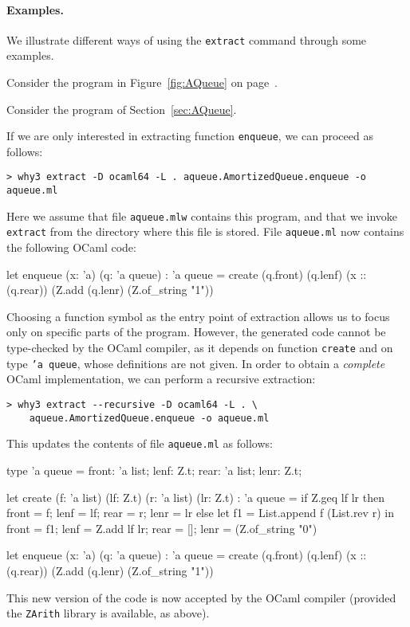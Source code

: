 \paragraph{Examples.}
We illustrate different ways of using the \texttt{extract} command through some
examples.
\begin{latexonly}
Consider the program in Figure~\ref{fig:AQueue} on page~\pageref{fig:AQueue}.
\end{latexonly}
\begin{htmlonly}
Consider the program of Section~\ref{sec:AQueue}.
\end{htmlonly}
If we are only interested in extracting function
\texttt{enqueue}, we can proceed as follows:
\begin{verbatim}
> why3 extract -D ocaml64 -L . aqueue.AmortizedQueue.enqueue -o aqueue.ml
\end{verbatim}
Here we assume that file \texttt{aqueue.mlw} contains this program, and that
we invoke \texttt{extract} from the directory where this file is stored. File
\texttt{aqueue.ml} now contains the following OCaml code:
\begin{whycode}
let enqueue (x: 'a) (q: 'a queue) : 'a queue =
  create (q.front) (q.lenf) (x :: (q.rear))
    (Z.add (q.lenr) (Z.of_string "1"))
\end{whycode}
Choosing a function symbol as the entry point of extraction allows us to focus
only on specific parts of the program. However, the generated code cannot be
type-checked by the OCaml compiler, as it depends on function \texttt{create}
and on type \texttt{'a queue}, whose definitions are not given. In order to
obtain a \emph{complete} OCaml implementation, we can perform a recursive
extraction:
\begin{verbatim}
> why3 extract --recursive -D ocaml64 -L . \
    aqueue.AmortizedQueue.enqueue -o aqueue.ml
\end{verbatim}
This updates the contents of file \texttt{aqueue.ml} as follows:
\begin{whycode}
type 'a queue = {
  front: 'a list;
  lenf: Z.t;
  rear: 'a list;
  lenr: Z.t;
  }

let create (f: 'a list) (lf: Z.t) (r: 'a list) (lr: Z.t) : 'a queue =
  if Z.geq lf lr
  then
    { front = f; lenf = lf; rear = r; lenr = lr }
  else
    let f1 = List.append f (List.rev r) in
    { front = f1; lenf = Z.add lf lr; rear = []; lenr = (Z.of_string "0") }

let enqueue (x: 'a) (q: 'a queue) : 'a queue =
  create (q.front) (q.lenf) (x :: (q.rear))
    (Z.add (q.lenr) (Z.of_string "1"))
\end{whycode}
This new version of the code is now accepted by the OCaml compiler
(provided the \texttt{ZArith} library is available, as above).

